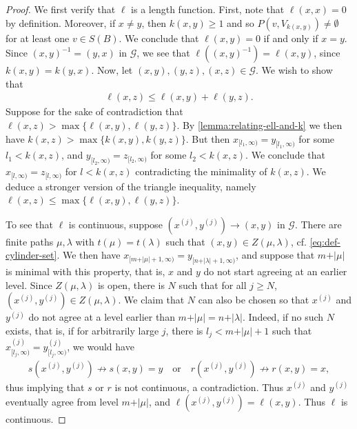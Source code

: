 \documentclass[10pt,a4paper]{amsart}
\newcommand{\G}{\mathcal{G}}
\begin{document}
	\begin{proof}
		We first verify that $\ell$ is a length function. 
		First, note that $\ell(x,x) = 0$ by definition. Moreover, if $x\neq y$, then $k(x,y)\geq 1$ and so $P(v, V_{k(x,y)}) \neq \emptyset$ for at least one $v \in S(B)$. We conclude that $\ell(x,y) = 0$ if and only if $x = y$. 
		Since $(x,y)^{-1} = (y,x)$ in $\G$, we see that $\ell((x,y)^{-1}) =  \ell(x,y)$, since $k(x,y) = k(y,x)$. 
		Now, let $(x,y), (y,z), (x,z) \in \G$. We wish to show that
		\begin{align*}
			\ell(x,z) \leq \ell(x,y) + \ell(y,z).
		\end{align*}
		Suppose for the sake of contradiction that $\ell(x,z) > \max \{ \ell(x,y), \ell(y,z)\}$. By \cref{lemma:relating-ell-and-k} we then have $k(x,z) > \max \{ k(x,y), k(y,z) \}$. But then $x_{[l_1, \infty)} = y_{[l_1, \infty)}$ for some $l_1 < k(x,z)$, and $y_{[l_2, \infty)} = z_{[l_2, \infty)}$ for some $l_2 < k(x,z)$.   We conclude that $x_{[l, \infty)} = z_{[l, \infty)}$ for $l < k(x,z)$ contradicting the minimality of $k(x,z)$. We deduce a stronger version of the triangle inequality, namely $\ell(x,z) \leq \max \{ \ell(x,y) , \ell(y,z) \}$. 
 
		
		To see that $\ell$ is continuous, suppose $(x^{(j)}, y^{(j)}) \to (x,y)$ in $\G$. There are finite paths $\mu, \lambda$ with $t(\mu) = t(\lambda)$ such that $(x,y) \in Z(\mu, \lambda)$, cf. \eqref{eq:def-cylinder-set}. We then have $x_{[m +\vert \mu  \vert + 1 , \infty)} = y_{[n + \vert \lambda \vert + 1 , \infty)}$, and suppose that $m + \vert \mu \vert$ is minimal with this property, that is, $x$ and $y$ do not start agreeing at an earlier level. Since $Z(\mu, \lambda)$ is open, there is $N$ such that for all $j \geq N$, $(x^{(j)}, y^{(j)}) \in Z(\mu, \lambda)$. We claim that $N$ can also be chosen so that $x^{(j)}$ and $y^{(j)}$ do not agree at a level earlier than $m + \vert \mu \vert = n + \vert \lambda \vert$. Indeed, if no such $N$ exists, that is, if for arbitrarily large $j$, there is $l_j < m + \vert \mu \vert +1$ such that $x^{(j)}_{[l_j, \infty)} =  y^{(j)}_{[l_j, \infty)}$, we would have
		\begin{align*}
			s(x^{(j)}, y^{(j)}) \not \to s(x,y) = y \quad \text{or} \quad r(x^{(j)}, y^{(j)}) \not \to r(x,y) = x,
		\end{align*}
		thus implying that $s$ or $r$ is not continuous, a contradiction. Thus $x^{(j)}$ and $y^{(j)}$ eventually agree from level $m + \vert \mu \vert $, and $\ell (x^{(j)}, y^{(j)}) = \ell (x,y)$. Thus $\ell$ is continuous. 
	\end{proof}
\end{document}
